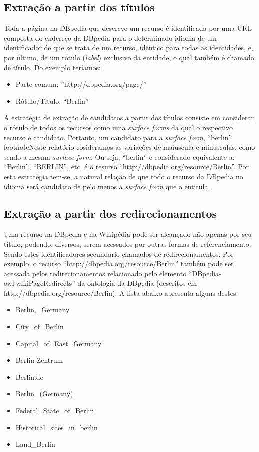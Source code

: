 \documentclass[10pt,a4paper]{llncs}
\begin{document}
\subsection{Extração a partir dos títulos} \label{extracao-titulos}
\indent\indent Toda a página na DBpedia que descreve um recurso é identificada por uma URL composta do endereço da DBpedia para o determinado idioma de um identificador de que se trata de um recurso, idêntico para todas as identidades, e, por último, de um rótulo (\textit{label}) exclusivo da entidade, o qual também é chamado de título. Do exemplo teríamos:
\begin{itemize}
 \item Parte comum: ''http://dbpedia.org/page/''
 \item Rótulo/Título: ``Berlin''
\end{itemize}

A estratégia de extração de candidatos a partir dos títulos consiste em considerar o rótulo de todos os recursos como uma \textit{surface forms} da qual o respectivo recurso é candidato. Portanto, um candidato para a \textit{surface form}, ``berlin''\\footnote{Neste relatório cosideramos as variações de maíuscula e minúsculas, como sendo a mesma \textit{surface form}. Ou seja, ``berlin'' é considerado equivalente a: ``Berlin'', ``BERLIN'', etc.} é o resurso ``http://dbpedia.org/resource/Berlin''. Por esta estratégia tem-se, a natural relação de que todo o recurso da DBpedia no idioma será candidato de pelo menos a \textit{surface form} que o entitula.

\subsection{Extração a partir dos redirecionamentos} \label{extracao-redirecionamentos}
\indent\indent Uma recurso na DBpedia e na Wikipédia pode ser alcançado não apenas por seu título, podendo, diversos, serem acessados por outras formas de referenciamento. Sendo estes identificadores secundário chamados de redirecionamentos. Por exemplo, o recurso ``http://dbpedia.org/resource/Berlin'' também pode ser acessada pelos redirecionamentos relacionado pelo elemento ``DBpedia-owl:wikiPageRedirects'' da ontologia da DBpedia (descritos em http://dbpedia.org/resource/Berlin). A lista abaixo apresenta alguns destes:
\begin{itemize}
 \item Berlin,\_Germany
 \item City\_of\_Berlin
 \item Capital\_of\_East\_Germany
 \item Berlin-Zentrum
 \item Berlin.de
 \item Berlin\_(Germany)
 \item Federal\_State\_of\_Berlin
 \item Historical\_sites\_in\_berlin
 \item Land\_Berlin
\end{itemize}
\end{document}
